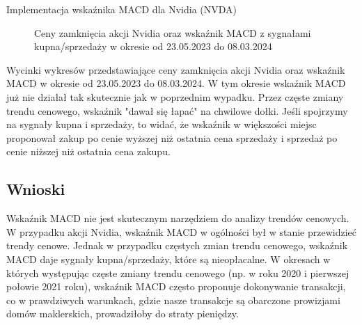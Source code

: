 \documentclass{article}
\begin{document}
\begin{section}{Implementacja wskaźnika MACD dla Nvidia (NVDA)}
    \begin{figure}[H]
        \caption{Ceny zamknięcia akcji Nvidia oraz wskaźnik MACD z sygnałami kupna/sprzedaży w okresie od 23.05.2023 do 08.03.2024}
    \end{figure}
    Wycinki wykresów przedstawiające ceny zamknięcia akcji Nvidia oraz wskaźnik MACD w okresie od 23.05.2023 do 08.03.2024.
    W tym okresie wskaźnik MACD już nie działał tak skutecznie jak w poprzednim wypadku. Przez częste zmiany trendu cenowego,
    wskaźnik "dawał się łapać" na chwilowe dołki. Jeśli spojrzymy na sygnały kupna i sprzedaży, to widać, że wskaźnik w większości miejsc
    proponował zakup po cenie wyższej niż ostatnia cena sprzedaży i sprzedaż po cenie niższej niż ostatnia cena zakupu.

    \subsection{Wnioski}
    Wskaźnik MACD nie jest skutecznym narzędziem do analizy trendów cenowych. W przypadku akcji Nvidia, wskaźnik MACD w ogólności był w stanie przewidzieć trendy cenowe.
    Jednak w przypadku częstych zmian trendu cenowego, wskaźnik MACD daje sygnały kupna/sprzedaży, które są nieopłacalne. W okresach w których występując
    częste zmiany trendu cenowego (np. w roku 2020 i pierwszej połowie 2021 roku), wskaźnik MACD często proponuje dokonywanie transakcji, co w prawdziwych 
    warunkach, gdzie nasze transakcje są obarczone prowizjami domów maklerskich, prowadziłoby do straty pieniędzy.
\end{section}
\end{document}
